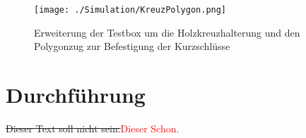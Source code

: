             \begin{figure}[htb]
                \centering
                \texttt{[image: ./Simulation/KreuzPolygon.png]}
                \caption{Erweiterung der Testbox um die Holzkreuzhalterung und den Polygonzug zur Befestigung der Kurzschlüsse}
                \label{fig:KreuzPolygonCST}
            \end{figure}
        
    \section{Durchführung}
    
    
    \sout{Dieser Text soll nicht sein.}\textcolor{red}{Dieser Schon.}

